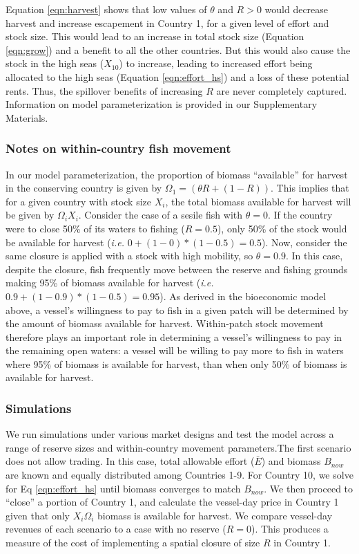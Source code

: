\documentclass[12pt]{article}
\begin{document}
\noindent Equation \ref{eqn:harvest} shows that low values of $\theta$ and $R > 0$ would decrease harvest and increase escapement in Country 1, for a given level of effort and stock size. This would lead to an increase in total stock size (Equation \ref{eqn:grow}) and a benefit to all the other countries. But this would also cause the stock in the high seas ($X_{10}$) to increase, leading to increased effort being allocated to the high seas (Equation \ref{eqn:effort_hs}) and a loss of these potential rents. Thus, the spillover benefits of increasing $R$ are never completely captured. Information on model parameterization is provided in our Supplementary Materials.

\subsubsection{Notes on within-country fish movement}

In our model parameterization, the proportion of biomass ``available'' for harvest in the conserving country is given by  $\Omega_1 = (\theta R + (1 - R))$. This implies that for a given country with stock size $X_i$, the total biomass available for harvest will be given by $\Omega_i X_i$. Consider the case of a sesile fish with $\theta = 0$. If the country were to close 50\% of its waters to fishing ($R = 0.5$), only 50\% of the stock would be available for harvest (\emph{i.e.} $0 + (1 - 0) * (1 - 0.5) = 0.5$). Now, consider the same closure is applied with a stock with high mobility, so $\theta = 0.9$. In this case, despite the closure, fish frequently move between the reserve and fishing grounds making 95\% of biomass available for harvest (\emph{i.e.} $0.9 + (1 - 0.9) * (1 - 0.5) = 0.95$). As derived in the bioeconomic model above, a vessel's willingness to pay to fish in a given patch will be determined by the amount of biomass available for harvest. Within-patch stock movement therefore plays an important role in determining a vessel's willingness to pay in the remaining open waters: a vessel will be willing to pay more to fish in waters where 95\% of biomass is available for harvest, than when only 50\% of biomass is available for harvest.

\subsubsection{Simulations}

We run simulations under various market designs and test the model across a range of reserve sizes and within-country movement parameters.The first scenario does not allow trading. In this case, total allowable effort ($\bar{E}$) and biomass $B_{now}$ are known and equally distributed among Countries 1-9. For Country 10, we solve for Eq \ref{eqn:effort_hs} until biomass converges to match $B_{now}$. We then proceed to ``close'' a portion of Country 1, and calculate the vessel-day price in Country 1 given that only $X_i\Omega_i$ biomass is available for harvest. We compare vessel-day revenues of each scenario to a case with no reserve ($R = 0$). This produces a measure of the cost of implementing a spatial closure of size $R$ in Country 1.
\end{document}
